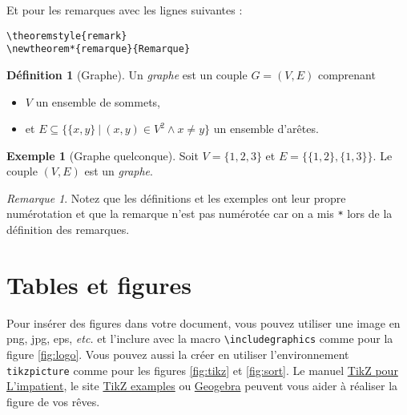 \documentclass{rapport}
\def\etc{\textit{etc.}\xspace}
\begin{document}
      Et pour les remarques avec les lignes suivantes : 
      
      \begin{verbatim}
\theoremstyle{remark}
\newtheorem*{remarque}{Remarque}\end{verbatim}
            
      \theoremstyle{definition}
      \newtheorem{definition}{Définition}
      \newtheorem{exemple}{Exemple}
      \theoremstyle{remark}
      \newtheorem*{remarque}{Remarque}
      
      \begin{definition}[Graphe]
        Un \emph{graphe} est un couple $G = (V, E)$ comprenant
        \begin{itemize}
          \item $V$ un ensemble de sommets, 
          \item et $E \subseteq \{\{x, y\}\ |\ (x, y) \in V^2 \wedge x \neq y\}$ un ensemble d'arêtes.
        \end{itemize}
      \end{definition}
      
      \begin{exemple}[Graphe quelconque]
        Soit $V = \{1, 2, 3\}$ et $E = \{\{1, 2\}, \{1, 3\}\}$. Le couple $(V, E)$ est un \emph{graphe}.
      \end{exemple}
      
      \begin{remarque}
        Notez que les définitions et les exemples ont leur propre numérotation et que la remarque n'est pas numérotée car on a mis \verb|*| lors de la définition des remarques.
      \end{remarque}

    \section{Tables et figures\label{sec:tabfig}}

      Pour insérer des figures dans votre document, vous pouvez utiliser une image en png, jpg, eps, \etc et l'inclure avec la macro \verb|\includegraphics| comme pour la figure \ref{fig:logo}. Vous pouvez aussi la créer en utiliser l'environnement \verb|tikzpicture| comme pour les figures \ref{fig:tikz} et \ref{fig:sort}. Le manuel \href{http://math.et.info.free.fr/TikZ/}{TikZ pour L'impatient}, le site \href{https://texample.net/tikz/examples/}{TikZ examples} ou \href{https://www.geogebra.org/}{Geogebra} peuvent vous aider à réaliser la figure de vos rêves.
      
\end{document}
